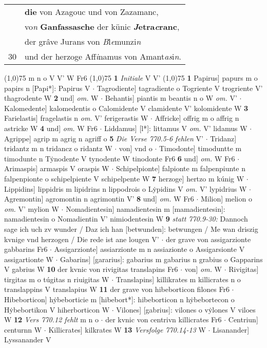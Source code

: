 \documentclass[8pt,a4paper,notitlepage]{article}
\begin{document}
\begin{table}[ht]
\begin{minipage}[t]{0.5\linewidth}
\begin{tabular}{rl}
 & \textbf{die} von Azagouc und von Zazamanc,\\ 
 & vo\textit{n} \textbf{Ganfassasche} der künic \textbf{\textit{J}etra\textit{c}ranc},\\ 
 & der grâve Jurans von \textit{B}l\textit{e}munzi\textit{n}\\ 
30 & und der herzoge Aff\textit{i}namus von Amant\textit{as}i\textit{n}.\\ 
\end{tabular}
\scriptsize
\line(1,0){75} \newline
m n o V V' W Fr6 \newline
\line(1,0){75} \newline
\textbf{1} \textit{Initiale} V V'  \newline
\line(1,0){75} \newline
\textbf{1} Papirus] papurs m o papirs n [Papi*]: Papirus V  $\cdot$ Tagrodiente] tagradiente o Togriente V trogriente V' thagrodente W \textbf{2} und] \textit{om.} W  $\cdot$ Behantis] piantis m beantis n o W \textit{om.} V'  $\cdot$ Kalomedente] kalomedentis o Calomidente V clamidente V' kolomidente W \textbf{3} Farielastis] fragelastis n \textit{om.} V' ferigerastis W  $\cdot$ Affricke] offrig m o affrig n astricke W \textbf{4} und] \textit{om.} W Fr6  $\cdot$ Liddamus] [l*]: littamus V \textit{om.} V' lidamus W  $\cdot$ Agrippe] agrip m agrig n agriff o \textbf{5} \textit{Die Verse 770.5-6 fehlen} V'   $\cdot$ Tridanz] tridantz m n tridancz o ridantz W  $\cdot$ von] vnd o  $\cdot$ Timodonte] timoduntte m timodunte n Tẏnodente V tynodente W tinodonte Fr6 \textbf{6} und] \textit{om.} W Fr6  $\cdot$ Arimaspis] armaspis V oraspis W  $\cdot$ Schipelpionte] falpionte m falpenpiunte n falpenpionte o schipelpiente V schipelpente W \textbf{7} herzoge] hertzo m kúnig W  $\cdot$ Lippidins] lippidris m lipidrins n lippodrois o Lẏpidins V \textit{om.} V' lypidrius W  $\cdot$ Agremontin] agromontin n agrimontin V' \textbf{8} und] \textit{om.} W Fr6  $\cdot$ Milion] melion o \textit{om.} V' mylion W  $\cdot$ Nomadientesin] namadientesin m [mamadientesin]: namadientesin o Nomadientin V' nimiodentesin W \textbf{9} \textit{statt 770.9-30:} Dannoch sage ich uch zv wunder / Daz ich han [betwunden]: betwungen / Me wan driszig kvnige vnd herzogen / Die rede ist ane lougen V'   $\cdot$ der grave von assigarzionte gabbarins Fr6  $\cdot$ Assigarzionte] assiarzionte m n assiazionte o Assigarsionte V assigartionte W  $\cdot$ Gabarins] [gararius]: gabarius m gabarius n grabius o Gapparins V gabrius W \textbf{10} der kvnic von rivigitas translapins Fr6  $\cdot$ von] \textit{om.} W  $\cdot$ Rivigitas] tirgitas m o túgitas n riuigitas W  $\cdot$ Translapins] killikrates m killicrates n o translappins V translapius W \textbf{11} der grave von hibeborticon filones Fr6  $\cdot$ Hibeborticon] hẏbeborticie m [hibebort*]: hibeborticon n hẏbebortecon o Hẏbebortikon V hiherborticon W  $\cdot$ Vilones] [gabrius]: vilones o vẏlones V viloes W \textbf{12} \textit{Vers 770.12 fehlt} m n o   $\cdot$ der kvnic von centrivn killicrates Fr6  $\cdot$ Centriun] centurnn W  $\cdot$ Killicrates] kilkrates W \textbf{13} \textit{Versfolge 770.14-13} W   $\cdot$ Lisanander] Lyssanander V 
\end{minipage}
\end{table}
\end{document}
